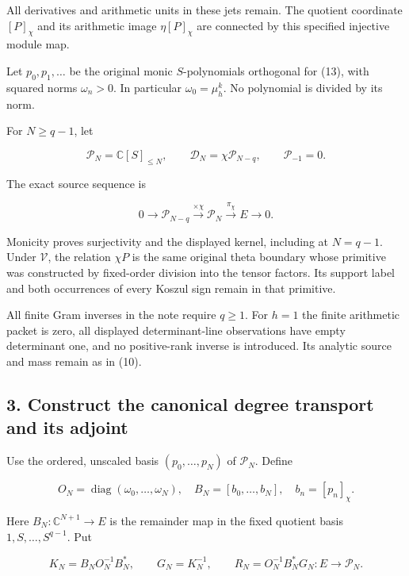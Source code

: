 All derivatives and arithmetic units in these jets remain. The quotient coordinate \([P]_\chi\) and its arithmetic image \(\eta[P]_\chi\) are connected by this specified injective module map.

Let \(p_0,p_1,\ldots\) be the original monic \(S\)-polynomials orthogonal for (13), with squared norms \(\omega_n>0\). In particular \(\omega_0=\mu_h^k\). No polynomial is divided by its norm.

For \(N\ge q-1\), let

\[
 \mathcal P_N=\mathbb C[S]_{\le N},\qquad
 \mathcal D_N=\chi\mathcal P_{N-q},\qquad
 \mathcal P_{-1}=0.                                               \tag{15}
\]

The exact source sequence is

\[
 0\longrightarrow\mathcal P_{N-q}
 \xrightarrow{\times\chi}\mathcal P_N
 \xrightarrow{\pi_\chi}E\longrightarrow0.                         \tag{16}
\]

Monicity proves surjectivity and the displayed kernel, including at \(N=q-1\). Under \(\mathcal V\), the relation \(\chi P\) is the same original theta boundary whose primitive was constructed by fixed-order division into the tensor factors. Its support label and both occurrences of every Koszul sign remain in that primitive.

All finite Gram inverses in the note require \(q\ge1\). For \(h=1\) the finite arithmetic packet is zero, all displayed determinant-line observations have empty determinant one, and no positive-rank inverse is introduced. Its analytic source and mass remain as in (10).

\subsection{3. Construct the canonical degree transport and its adjoint}\label{endpoint-restriction_original--construct-the-canonical-degree-transport-and-its-adjoint}

Use the ordered, unscaled basis \((p_0,\ldots,p_N)\) of \(\mathcal P_N\). Define

\[
 O_N=\operatorname{diag}(\omega_0,\ldots,\omega_N),\quad
 B_N=[b_0,\ldots,b_N],\quad b_n=[p_n]_\chi.                         \tag{17}
\]

Here \(B_N:\mathbb C^{N+1}\to E\) is the remainder map in the fixed quotient basis \(1,S,\ldots,S^{q-1}\). Put

\[
 K_N=B_NO_N^{-1}B_N^*,\qquad G_N=K_N^{-1},\qquad
 R_N=O_N^{-1}B_N^*G_N:E\to\mathcal P_N.                            \tag{18}
\]

